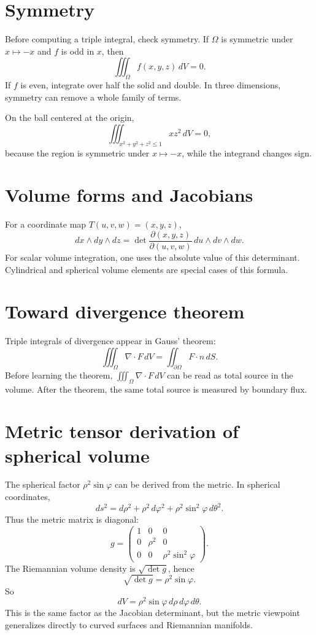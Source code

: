 \section{Symmetry}

Before computing a triple integral, check symmetry.  If \(\Omega\) is symmetric under \(x\mapsto -x\) and \(f\) is odd in \(x\), then
\[
  \iiint_{\Omega} f(x,y,z)\,dV=0.
\]
If \(f\) is even, integrate over half the solid and double.  In three dimensions, symmetry can remove a whole family of terms.

\begin{example}
On the ball centered at the origin,
\[
  \iiint_{x^2+y^2+z^2\le1} xz^2\,dV=0,
\]
because the region is symmetric under \(x\mapsto -x\), while the integrand changes sign.
\end{example}

\section{Volume forms and Jacobians}

For a coordinate map \(T(u,v,w)=(x,y,z)\),
\[
  dx\wedge dy\wedge dz
  =\det\frac{\partial(x,y,z)}{\partial(u,v,w)}
  \,du\wedge dv\wedge dw.
\]
For scalar volume integration, one uses the absolute value of this determinant.  Cylindrical and spherical volume elements are special cases of this formula.

\section{Toward divergence theorem}

Triple integrals of divergence appear in Gauss' theorem:
\[
  \iiint_{\Omega} \nabla\cdot F\,dV
  =\iint_{\partial\Omega}F\cdot n\,dS.
\]
Before learning the theorem, \(\iiint_{\Omega} \nabla\cdot F\,dV\) can be read as total source in the volume.  After the theorem, the same total source is measured by boundary flux.

\section{Metric tensor derivation of spherical volume}

The spherical factor \(\rho^2\sin\varphi\) can be derived from the metric.  In spherical coordinates,
\[
  ds^2=d\rho^2+\rho^2\,d\varphi^2+\rho^2\sin^2\varphi\,d\theta^2.
\]
Thus the metric matrix is diagonal:
\[
  g=
  \begin{pmatrix}
  1&0&0\\
  0&\rho^2&0\\
  0&0&\rho^2\sin^2\varphi
  \end{pmatrix}.
\]
The Riemannian volume density is \(\sqrt{\det g}\), hence
\[
  \sqrt{\det g}=\rho^2\sin\varphi.
\]
So
\[
  dV=\rho^2\sin\varphi\,d\rho\,d\varphi\,d\theta.
\]
This is the same factor as the Jacobian determinant, but the metric viewpoint generalizes directly to curved surfaces and Riemannian manifolds.

